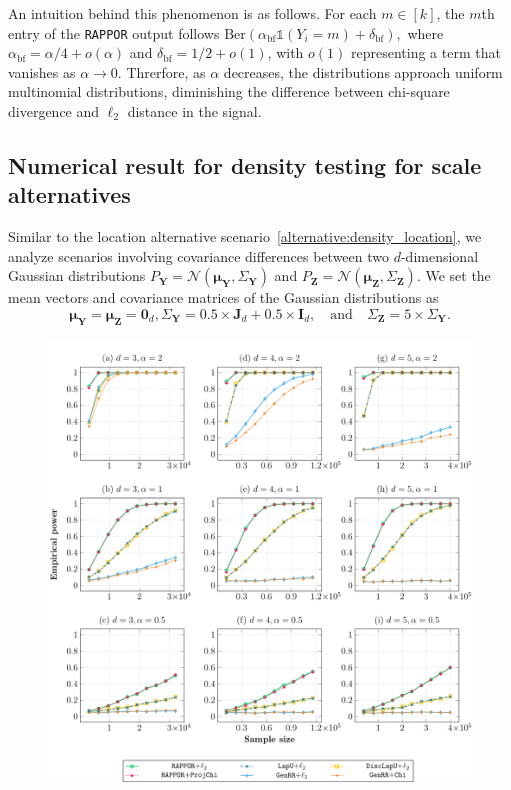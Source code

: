 \documentclass[twoside,11pt]{article}
\newcommand{\rvTwo}{Y}
\newcommand{\rvThree}{Z}
\newcommand{\vectorize}[1]{\mathbf{#1}}
\newcommand{\sampleIndexOne}{i}
\newcommand{\dimDensity}{d} %
\newcommand{\alphabetSize}{k} %
\newcommand{\vectorIndex}{m}
\newcommand{\privacyParameter}{\alpha} %
\newcommand{\privacyParameterrappor}{\privacyParameter_{\mathrm{bf}}}
\newcommand{\smallNumber}{\delta}
\newcommand{\smallNumberrappor}{\smallNumber_{\mathrm{bf}}}
\begin{document}
\begin{appendix}
	An intuition behind this phenomenon is as follows. For each $\vectorIndex \in [\alphabetSize]$, the $\vectorIndex$th entry of the \texttt{RAPPOR} output follows  
	$
	\mathrm{Ber} \left( \privacyParameterrappor \mathds{1}(\rvTwo_{\sampleIndexOne} = \vectorIndex) + \smallNumberrappor \right),
	$
	where $\privacyParameterrappor = \privacyParameter/4 + o(\privacyParameter)$ and $\smallNumberrappor = 1/2 + o(1)$, with \( o(1) \) representing a term that vanishes as $\privacyParameter \to 0$. Threrfore, as $\privacyParameter$ decreases, the distributions approach uniform multinomial distributions, diminishing the difference between chi-square divergence and $\ell_2$ distance in the signal.
	
	\subsection{Numerical result for density testing for scale alternatives}\label{simul_scale}
	Similar to the location alternative scenario~\eqref{alternative:density_location}, we analyze scenarios involving covariance differences between two $\dimDensity$-dimensional Gaussian distributions
	$P_{\vectorize{\rvTwo}} = \mathcal{N}(
	\boldsymbol{\mu}_{\vectorize{\rvTwo}}
	,
	\Sigma_{\vectorize{\rvTwo}}
	)$
	and
	$P_{\vectorize{\rvThree}} = \mathcal{N}(
	\boldsymbol{\mu}_{\vectorize{\rvThree}}
	,
	\Sigma_{\vectorize{\rvThree}}
	)$. 
	We set the mean vectors and covariance matrices of the Gaussian distributions as
	\begin{equation}\label{alternative:density_scale}
		\boldsymbol{\mu}_{\vectorize{\rvTwo}}
		=
		\boldsymbol{\mu}_{\vectorize{\rvThree}}
		= \mathbf{0}_{\dimDensity},
		\Sigma_{\vectorize{\rvTwo}} = 
		0.5\times \mathbf{J}_{\dimDensity}
		+
		0.5 \times \mathbf{I}_{\dimDensity},
		\quad \text{and} \quad
		\Sigma_{\vectorize{\rvThree}}
		=
		5\times \Sigma_{\vectorize{\rvTwo}}.
	\end{equation}
	\begin{figure}
		\centering
		\includegraphics[width=0.95\linewidth]{density_scale.pdf}

\end{figure}
\end{appendix}
\end{document}
